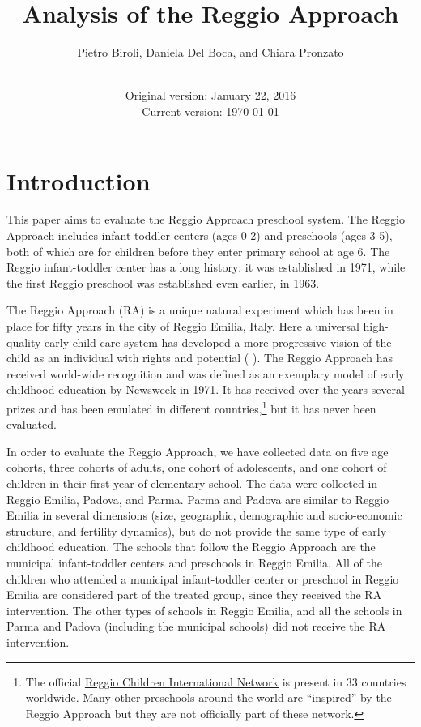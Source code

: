 \documentclass[12pt]{article}
\begin{document}
\title{Analysis of the Reggio Approach}
\author{Pietro Biroli, Daniela Del Boca, and Chiara Pronzato}
\date[VERY PRELIMINARY DRAFT]{ \\
Original version: January 22, 2016 \\
Current version: \today }
\maketitle

\bigskip

\doublespacing

\section{Introduction}

\label{sec:intro}

This paper aims to evaluate the Reggio Approach preschool system. The Reggio
Approach includes infant-toddler centers (ages 0-2) and preschools (ages
3-5), both of which are for children before they enter primary school at age
6. The Reggio infant-toddler center has a long history: it was established
in 1971, while the first Reggio preschool was established even earlier, in
1963.

The Reggio Approach (RA) is a unique natural experiment which has been in
place for fifty years in the city of Reggio Emilia, Italy. Here a universal
high-quality early child care system has developed a more progressive vision
of the child as an individual with rights and potential (\cite{Malaguzzi1993}%
). The Reggio Approach has received world-wide recognition and was defined
as an exemplary model of early childhood education by Newsweek in 1971. It
has received over the years several prizes and has been emulated in
different countries,\footnote{%
The official \href{http://www.reggiochildren.it/network/?lang=en}{Reggio
Children International Network} is present in 33 countries worldwide. Many
other preschools around the world are ``inspired'' by the Reggio Approach
but they are not officially part of these network.} but it has never been
evaluated.

In order to evaluate the Reggio Approach, we have collected data on five age
cohorts, three cohorts of adults, one cohort of adolescents, and one cohort
of children in their first year of elementary school. The data were
collected in Reggio Emilia, Padova, and Parma. Parma and Padova are similar
to Reggio Emilia in several dimensions (size, geographic, demographic and
socio-economic structure, and fertility dynamics), but do not provide the
same type of early childhood education. The schools that follow the Reggio
Approach are the municipal infant-toddler centers and preschools in Reggio
Emilia. All of the children who attended a municipal infant-toddler center
or preschool in Reggio Emilia are considered part of the treated group,
since they received the RA intervention. The other types of schools in
Reggio Emilia, and all the schools in Parma and Padova (including the
municipal schools) did not receive the RA intervention.
\end{document}
